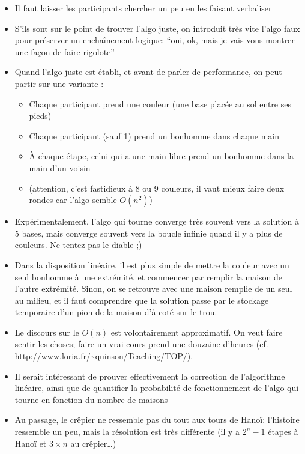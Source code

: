 \documentclass[a5paper,pagesize,DIV=14]{scrbook}
\begin{document}
\begin{itemize}
  \item Il faut laisser les participants chercher un peu en les faisant verbaliser
  \item S'ils sont sur le point de trouver l'algo juste, on introduit très vite l'algo faux pour préserver un enchaînement logique: ``oui, ok, mais je vais vous montrer une façon de faire rigolote''
  \item Quand l'algo juste est établi, et avant de parler de performance, on peut partir sur une variante :
    \begin{itemize}
    \item Chaque participant prend une couleur (une base placée au sol entre ses pieds)
    \item Chaque participant (sauf 1) prend un bonhomme dans chaque main
    \item À chaque étape, celui qui a une main libre prend un bonhomme dans la main d'un voisin
    \item (attention, c'est fastidieux à 8 ou 9 couleurs, il vaut mieux faire deux rondes car l'algo semble $O(n^2)$)
    \end{itemize}
  \item Expérimentalement, l'algo qui tourne converge très souvent vers la solution à 5 bases, mais converge souvent vers la boucle infinie quand il y a plus de couleurs. Ne tentez pas le diable ;)
  \item Dans la disposition linéaire, il est plus simple de mettre la couleur avec un seul bonhomme à une extrémité, et commencer par remplir la maison de l'autre extrémité. Sinon, on se retrouve avec une maison remplie de un seul au milieu, et il faut comprendre que la solution passe par le stockage temporaire d'un pion de la maison d'à coté sur le trou.
  \item Le discours sur le $O(n)$ est volontairement approximatif. On veut faire sentir les choses; faire un vrai cours prend une douzaine d'heures (cf. \url{http://www.loria.fr/~quinson/Teaching/TOP/}).
  \item Il serait intéressant de prouver effectivement la correction de l'algorithme linéaire, ainsi que de quantifier la probabilité de fonctionnement de l'algo qui tourne en fonction du nombre de maisons
  \item Au passage, le crêpier ne ressemble pas du tout aux tours de Hanoï:
    l'histoire ressemble un peu, mais la résolution est très différente (il y a
    $2^n-1$ étapes à Hanoï et $3\times n$ au crêpier{\ldots})
\end{itemize}
\end{document}
